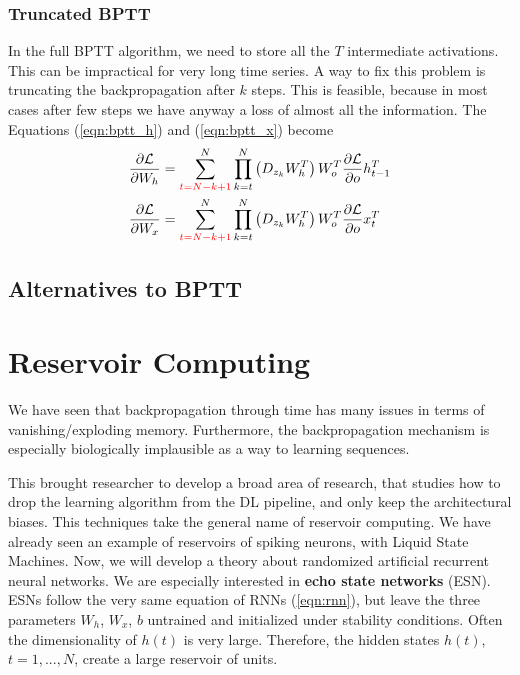 \documentclass[oneside]{book}
\theoremstyle{definition}
\theoremstyle{plain}
\begin{document}
\subsubsection{Truncated BPTT}
In the full BPTT algorithm, we need to store all the $T$  intermediate activations. This can be impractical for very long time series. 
A way to fix this problem is truncating the backpropagation after $k$ steps. This is feasible, because in most cases after few steps we have anyway a loss of almost all the information. The Equations (\ref{eqn:bptt_h}) and (\ref{eqn:bptt_x}) become
\begin{align}
\label{eqn:bptt_h_trunc}
        \frac{\partial \mathcal{L}}{\partial W_h} &=\sum_{\textcolor{red}{t= N-k+1}}^N \prod_{k=t}^{N} \left( D_{z_k} W^T_{h}\right) W_o^T\frac{\partial\mathcal{L}}{\partial o} h^T_{t-1} \\
\label{eqn:bptt_x_trunc}
        \frac{\partial \mathcal{L}}{\partial W_x} &=\sum_{\textcolor{red}{t= N-k+1}}^N \prod_{k=t}^{N} \left( D_{z_k} W^T_{h}\right) W_o^T\frac{\partial\mathcal{L}}{\partial o} x^T_{t} 
\end{align}
\subsection{Alternatives to BPTT}
\todo{}
\section{Reservoir Computing}

We have seen that backpropagation through time has many issues in terms of vanishing/exploding memory. Furthermore, the backpropagation mechanism is especially biologically implausible as a way to learning sequences.

This brought researcher to develop a broad area of research, that studies how to drop the learning algorithm from the DL pipeline, and only keep the architectural biases. This techniques take the general name of reservoir computing. We have already seen an example of reservoirs of spiking neurons, with Liquid State Machines. Now, we will develop a theory about randomized artificial recurrent neural networks. We are especially interested in \textbf{echo state networks} (ESN). ESNs follow the very same equation of RNNs (\ref{eqn:rnn}), but leave the three parameters $W_h$, $W_x$, $b$ untrained and initialized under stability conditions. 
Often the dimensionality of $h(t)$ is very large. Therefore, the hidden states $h(t)$, $t=1,...,N$, create a large reservoir of units.
\end{document}
